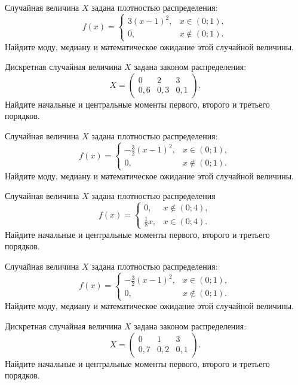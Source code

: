\vfill

\newpage\setcounter{zad}{0}

\z Случайная величина $X$ задана плотностью распределения: $$f(x) = \begin{cases} 3(x-1)^2, & x \in (0; 1), \\ 0, & x \not\in (0; 1). \end{cases}$$ Найдите моду, медиану и математическое ожидание этой случайной величины.


\vfill

\z Дискретная случайная величина $X$ задана законом распределения: $$ X = \left(\begin{array}{rrr}0 & 2 & 3\\0{,}6 & 0{,}3 & 0{,}1\end{array}\right).$$ Найдите начальные и центральные моменты первого, второго и третьего порядков.
 

\vfill

\newpage\setcounter{zad}{0}

\z Случайная величина $X$ задана плотностью распределения: $$f(x) = \begin{cases} -\frac{3}{2}(x-1)^2, & x \in (0; 1), \\ 0, & x \not\in (0; 1). \end{cases}$$ Найдите моду, медиану и математическое ожидание этой случайной величины.


\vfill

\z Случайная величина $X$ задана плотностью распределения $$f(x) = \begin{cases}0, & x\not\in(0; 4), \\ \frac{1}{8}x, & x\in(0; 4).\end{cases}$$ Найдите начальные и центральные моменты первого, второго и третьего порядков.
 

\vfill

\newpage\setcounter{zad}{0}

\z Случайная величина $X$ задана плотностью распределения: $$f(x) = \begin{cases} -\frac{3}{2}(x-1)^2, & x \in (0; 1), \\ 0, & x \not\in (0; 1). \end{cases}$$ Найдите моду, медиану и математическое ожидание этой случайной величины.


\vfill

\z Дискретная случайная величина $X$ задана законом распределения: $$ X = \left(\begin{array}{rrr}0 & 1 & 3\\0{,}7 & 0{,}2 & 0{,}1\end{array}\right).$$ Найдите начальные и центральные моменты первого, второго и третьего порядков.
 

